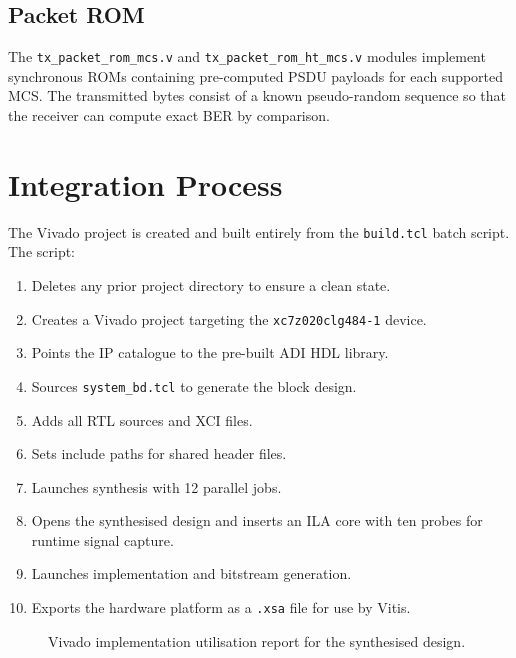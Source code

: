 \documentclass[12pt, a4paper, oneside]{report}
\begin{document}
\subsection{Packet ROM}

The \texttt{tx\_packet\_rom\_mcs.v} and \texttt{tx\_packet\_rom\_ht\_mcs.v} modules implement synchronous ROMs containing pre-computed PSDU payloads for each supported MCS. The transmitted bytes consist of a known pseudo-random sequence so that the receiver can compute exact BER by comparison.

\section{Integration Process}

The Vivado project is created and built entirely from the \texttt{build.tcl} batch script. The script:

\begin{enumerate}[noitemsep]
  \item Deletes any prior project directory to ensure a clean state.
  \item Creates a Vivado project targeting the \texttt{xc7z020clg484-1} device.
  \item Points the IP catalogue to the pre-built ADI HDL library.
  \item Sources \texttt{system\_bd.tcl} to generate the block design.
  \item Adds all RTL sources and XCI files.
  \item Sets include paths for shared header files.
  \item Launches synthesis with 12 parallel jobs.
  \item Opens the synthesised design and inserts an ILA core with ten probes for runtime signal capture.
  \item Launches implementation and bitstream generation.
  \item Exports the hardware platform as a \texttt{.xsa} file for use by Vitis.
\end{enumerate}

\begin{figure}[H]
  \centering
  \caption{Vivado implementation utilisation report for the synthesised design.}
  \label{fig:utilisation}
\end{figure}
\end{document}
